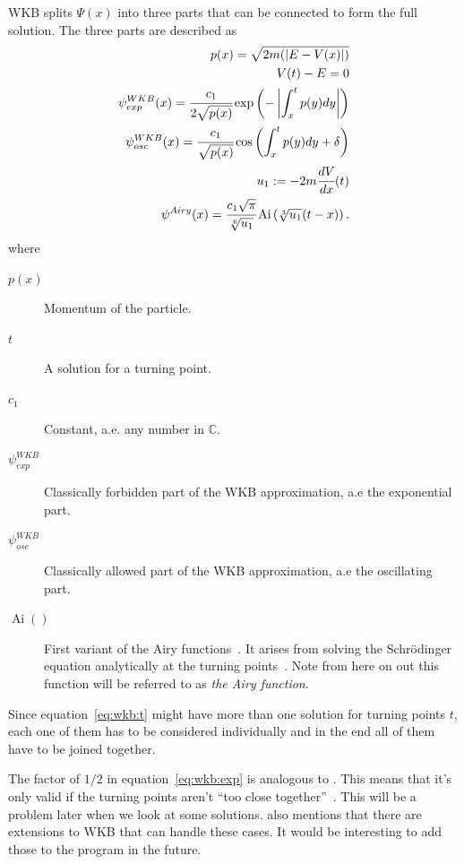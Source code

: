 \documentclass[11pt,DIV=10,final]{scrreprt} %
\begin{document}
WKB splits $\Psi(x)$ into three parts that can be connected to form the full solution. The three parts are described as
\begin{align}
\label{eq:wkb:momentum}
  p(x) = \sqrt{2m(|E - V(x)|)} \\
\label{eq:wkb:t}
  V(t) - E = 0 \\
\label{eq:wkb:exp}
  \psi^{WKB}_{exp}(x)= \cfrac{c_{1}}{2 \sqrt{p(x)}} \exp\left(-\left|\int_{x}^{t}p(y) dy\right|\right) \\
\label{eq:wkb:osc}
  \psi^{WKB}_{osc} (x)= \cfrac{c_{1}}{\sqrt{p(x)}} \cos\left(\int_{x}^{t}p(y) dy + \delta \right) \\
  u_{1} := -2 m \cfrac{dV}{dx}(t) \\
\label{eq:airy}
  \psi^{Airy}(x) = \cfrac{c_{1} \sqrt{\pi}}{\sqrt[6]{u_{1}}} \operatorname{Ai}\left(\sqrt[3]{u_{1}} (t - x)\right).
\end{align}
where
\begin{description}
    \item[$p(x)$] Momentum of the particle.
    \item[$t$] A solution for a turning point.
    \item[$c_{1}$] Constant, a.e. any number in $\mathbb{C}$.
    \item[$\psi^{WKB}_{exp}$] Classically forbidden part of the WKB approximation, a.e the exponential part.
    \item[$\psi^{WKB}_{osc}$] Classically allowed part of the WKB approximation, a.e the oscillating part.
    \item[$\operatorname{Ai}()$] First variant of the Airy functions~\cite{math:airy}. It arises from solving the Schrödinger equation analytically at the turning points~\cite[section
            15.5]{hall2013quantum}. Note from here on out this function will be referred to as \emph{the Airy function}.
\end{description}

Since equation~\ref{eq:wkb:t} might have more than one solution for turning points $t$,  each one of them has to be considered individually and in the end all of them have to be joined together.

The factor of $1/2$ in equation~\ref{eq:wkb:exp} is analogous to \citep[eq. 92]{robert2020wkb}. This means that it's only valid if the turning points aren't ``too close together''~\citep{robert2020wkb}.
This will be a problem later when we look at some solutions. \cite{robert2020wkb} also mentions that there are extensions to WKB that can handle these cases. It would be interesting to add those to the
program in the future.
\end{document}
